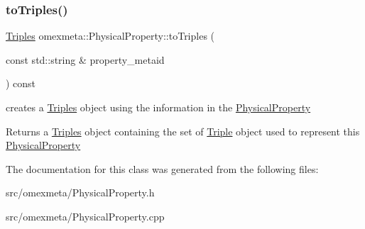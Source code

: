 \subsubsection{\texorpdfstring{to\+Triples()}{toTriples()}}
{\footnotesize\ttfamily \hyperlink{classomexmeta_1_1Triples}{Triples} omexmeta\+::\+Physical\+Property\+::to\+Triples (\begin{DoxyParamCaption}\item[{const std\+::string \&}]{property\+\_\+metaid }\end{DoxyParamCaption}) const}



creates a \hyperlink{classomexmeta_1_1Triples}{Triples} object using the information in the \hyperlink{classomexmeta_1_1PhysicalProperty}{Physical\+Property} 

\begin{DoxyReturn}{Returns}
a \hyperlink{classomexmeta_1_1Triples}{Triples} object containing the set of \hyperlink{classomexmeta_1_1Triple}{Triple} object used to represent this \hyperlink{classomexmeta_1_1PhysicalProperty}{Physical\+Property} 
\end{DoxyReturn}


The documentation for this class was generated from the following files\+:\begin{DoxyCompactItemize}
\item 
src/omexmeta/Physical\+Property.\+h\item 
src/omexmeta/Physical\+Property.\+cpp\end{DoxyCompactItemize}
